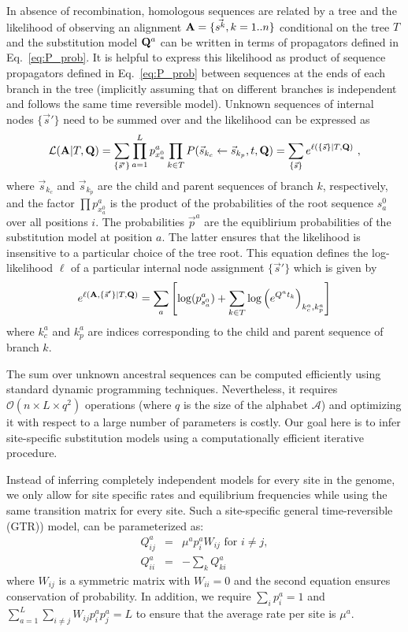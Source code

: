 \documentclass[aps,rmp, onecolumn]{revtex4}
\newcommand{\mat}[1]{{\bf #1}}
\newcommand{\abet}{\mathcal{A}}
\newcommand{\eqp}{p}
\newcommand{\LH}{\mathcal{L}}
\newcommand{\lh}{\ell}
\begin{document}
In absence of recombination, homologous sequences are related by a tree and the likelihood of observing an alignment $\mat{A}=\{\vec{s^k}, k=1..n\}$ conditional on the tree $T$ and the substitution model $\mat{Q}^{a}$ can be written in terms of propagators defined in Eq.~\ref{eq:P_prob}.
It is helpful to express this likelihood as product of sequence propagators defined in Eq.~\ref{eq:P_prob} between sequences at the ends of each branch in the tree (implicitly assuming that on different branches is independent and follows the same time reversible model).
Unknown sequences of internal nodes $\{\vec{s}'\}$ need to be summed over and the likelihood can be expressed as
\begin{equation}
	\LH(\mat{A}|T,\mat{Q}) = \sum_{\{\vec{s}'\}}\prod_{a=1}^L \eqp^{a}_{x^{0}_a} \prod_{k\in T}P(\vec{s}_{k_c}\leftarrow \vec{s}_{k_p},t,\mat{Q}) = \sum_{\{\vec{s}\}} e^{\lh(\{\vec{s}\} |T, \mat{Q})}  \ ,
	\label{eq:LH}
\end{equation}
where $\vec{s}_{k_c}$ and $\vec{s}_{k_p}$ are the child and parent sequences of branch $k$, respectively, and the factor $\prod \eqp^{a}_{x^{0}_a}$ is the product of the probabilities of the root sequence $s^{0}_a$ over all positions $i$.
The probabilities $\vec{\eqp}^{a}$ are the equiblirium probabilities of the substitution model at position $a$.
The latter ensures that the likelihood is insensitive to a particular choice of the tree root.
This equation defines the log-likelihood $\lh$ of a particular internal node assignment $\{\vec{s}'\}$ which is given by
\begin{equation}
	e^{\lh(\mat{A}, \{\vec{s}'\} |T, \mat{Q})} = \sum_a \left[\log(\eqp^a_{s^{0}_a}) + \sum_{k\in T} \log\left( e^{Q^at_k} \right)_{k^a_c, k^a_p}\right]
\end{equation}
where $k^a_c$ and $k^a_p$ are indices corresponding to the child and parent sequence of branch $k$.

The sum over unknown ancestral sequences can be computed efficiently using standard dynamic programming techniques.
Nevertheless, it requires $\mathcal{O}(n\times L \times q^2)$ operations (where $q$ is the size of the alphabet $\abet$) and optimizing it with respect to a large number of parameters is costly.
Our goal here is to infer site-specific substitution models using a computationally efficient iterative procedure.

Instead of inferring completely independent models for every site in the genome, we only allow for site specific rates and equilibrium frequencies while using the same transition matrix for every site.
Such a site-specific general time-reversible (GTR)) model, can be parameterized as:
\begin{eqnarray}
Q^{a}_{ij} &=& \mu^{a}\eqp^{a}_{i} W_{ij} \textrm{ for } i\neq j,\nonumber \\
Q^{a}_{ii} &=& -\sum_k Q^{a}_{ki}
\label{eq:Qij}
\end{eqnarray}
where $W_{ij}$ is a symmetric matrix with $W_{ii}=0$ and the second equation ensures conservation of probability.
In addition, we require $\sum_i \eqp^{a}_i = 1$ and $\sum_{a=1}^L\sum_{i\neq j}W_{ij}p^{a}_ip^{a}_j=L$ to ensure that the average rate per site is $\mu^{a}$.
\end{document}
